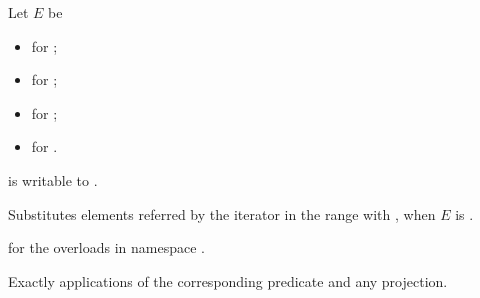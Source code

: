 \begin{itemdescr}
\pnum
Let $E$ be
\begin{itemize}
\item {} for ;
\item {} for ;
\item {} for ;
\item {} for .
\end{itemize}


\pnum
\mandates
{} is writable to .

\pnum
\effects
Substitutes elements referred by the iterator 
in the range  with ,
when $E$ is .

\pnum
\returns
{} for the overloads in namespace .

\pnum
\complexity
Exactly  applications
of the corresponding predicate and any projection.
\end{itemdescr}

